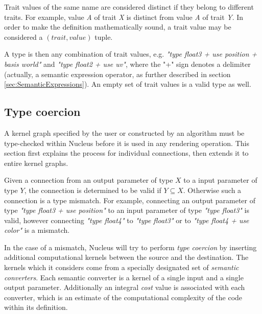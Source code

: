 Trait values of the same name are considered distinct if they belong to different traits. For example, value \emph{A} of trait \emph{X} is distinct from value \emph{A} of trait \emph{Y}. In order to make the definition mathematically sound, a trait value may be considered a $(trait, value)$ tuple.

A type is then any combination of trait values, e.g. \emph{"type float3 + use position + basis world"} and \emph{"type float2 + use uv"}, where the "+" sign denotes a delimiter (actually, a semantic expression operator, as further described in section \ref{sec:SemanticExpressions}). An empty set of trait values is a valid type as well.

\subsection{Type coercion}
\label{sec:TypeCoercion}

A kernel graph specified by the user or constructed by an algorithm must be type-checked within Nucleus before it is used in any rendering operation. This section first explains the process for individual connections, then extends it to entire kernel graphs.

Given a connection from an output parameter of type $X$ to a input parameter of type $Y$, the connection is determined to be valid if $Y \subseteq X$. Otherwise such a connection is a type mismatch. For example, connecting an output parameter of type \emph{"type float3 + use position"} to an input parameter of type \emph{"type float3"} is valid, however connecting \emph{"type float4"} to \emph{"type float3"} or to \emph{"type float4 + use color"} is a mismatch.

In the case of a mismatch, Nucleus will try to perform \emph{type coercion} by inserting additional computational kernels between the source and the destination. The kernels which it considers come from a specially designated set of \emph{semantic converters}. Each semantic converter is a kernel of a single input and a single output parameter. Additionally an integral \emph{cost} value is associated with each converter, which is an estimate of the computational complexity of the code within its definition.

